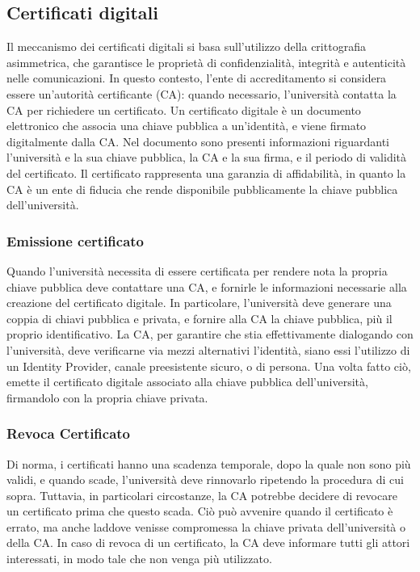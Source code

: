 \documentclass[a4paper,12pt]{article}
\begin{document}
\subsection{Certificati digitali} 
Il meccanismo dei certificati digitali si basa sull'utilizzo della crittografia asimmetrica, che garantisce le proprietà di confidenzialità, integrità e autenticità nelle comunicazioni. 
In questo contesto, l'ente di accreditamento si considera essere un'autorità certificante (CA): quando necessario, l'università contatta la CA per richiedere un certificato.
\newline
Un certificato digitale è un documento elettronico che associa una chiave pubblica a un'identità, e viene firmato digitalmente dalla CA. Nel documento sono presenti informazioni riguardanti l'università e la sua chiave pubblica, la CA e la sua firma, e il periodo di validità del certificato. Il certificato rappresenta una garanzia di affidabilità, in quanto la CA è un ente di fiducia che rende disponibile pubblicamente la chiave pubblica dell'università.
\subsubsection{Emissione certificato} Quando l'università necessita di essere certificata per rendere nota la propria chiave pubblica deve contattare una CA, e fornirle le informazioni necessarie alla creazione del certificato digitale. In particolare, l'università deve generare una coppia di chiavi pubblica e privata, e fornire alla CA la chiave pubblica, più il proprio identificativo. La CA, per garantire che stia effettivamente dialogando con l'università, deve verificarne via mezzi alternativi l'identità, siano essi l'utilizzo di un Identity Provider, canale preesistente sicuro, o di persona. Una volta fatto ciò, emette il certificato digitale associato alla chiave pubblica dell'università, firmandolo con la propria chiave privata.
\subsubsection{Revoca Certificato} Di norma, i certificati hanno una scadenza temporale, dopo la quale non sono più validi, e quando scade, l'università deve rinnovarlo ripetendo la procedura di cui sopra. Tuttavia, in particolari circostanze, la CA potrebbe decidere di revocare un certificato prima che questo scada. Ciò può avvenire quando il certificato è errato, ma anche laddove venisse compromessa la chiave privata dell'università o della CA. In caso di revoca di un certificato, la CA deve informare tutti gli attori interessati, in modo tale che non venga più utilizzato.
\end{document}
